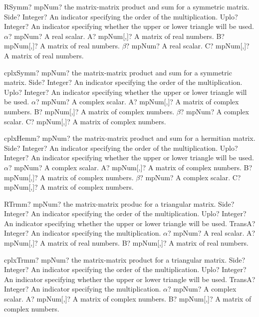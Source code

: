 \documentclass[12pt,a4paper,openany]{book}
\begin{document}
\begin{mpFunctionsExtract}
\mpFunctionSeven
{RSymm? mpNum? the matrix-matrix product and sum for a symmetric matrix.}
{Side? Integer? An indicator specifying the order of the multiplication.}
{Uplo? Integer? An indicator specifying whether the upper or lower triangle will be used.}
{$\alpha$? mpNum? A real scalar.}
{A? mpNum[,]? A matrix of real numbers.}
{B? mpNum[,]? A matrix of real numbers.}
{$\beta$? mpNum? A real scalar.}
{C? mpNum[,]? A matrix of real numbers.}
\end{mpFunctionsExtract}

\begin{mpFunctionsExtract}
\mpFunctionSeven
{cplxSymm? mpNum? the matrix-matrix product and sum for a symmetric matrix.}
{Side? Integer? An indicator specifying the order of the multiplication.}
{Uplo? Integer? An indicator specifying whether the upper or lower triangle will be used.}
{$\alpha$? mpNum? A complex scalar.}
{A? mpNum[,]? A matrix of complex numbers.}
{B? mpNum[,]? A matrix of complex numbers.}
{$\beta$? mpNum? A complex scalar.}
{C? mpNum[,]? A matrix of complex numbers.}
\end{mpFunctionsExtract}

\begin{mpFunctionsExtract}
\mpFunctionSeven
{cplxHemm? mpNum? the matrix-matrix product and sum for a hermitian matrix.}
{Side? Integer? An indicator specifying the order of the multiplication.}
{Uplo? Integer? An indicator specifying whether the upper or lower triangle will be used.}
{$\alpha$? mpNum? A complex scalar.}
{A? mpNum[,]? A matrix of complex numbers.}
{B? mpNum[,]? A matrix of complex numbers.}
{$\beta$? mpNum? A complex scalar.}
{C? mpNum[,]? A matrix of complex numbers.}
\end{mpFunctionsExtract}

\begin{mpFunctionsExtract}
\mpFunctionSix
{RTrmm? mpNum? the matrix-matrix produc for a triangular matrix.}
{Side? Integer? An indicator specifying the order of the multiplication.}
{Uplo? Integer? An indicator specifying whether the upper or lower triangle will be used.}
{TransA? Integer? An indicator specifying the multiplication.}
{$\alpha$? mpNum? A real scalar.}
{A? mpNum[,]? A matrix of real numbers.}
{B? mpNum[,]? A matrix of real numbers.}
\end{mpFunctionsExtract}

\begin{mpFunctionsExtract}
\mpFunctionSix
{cplxTrmm? mpNum? the matrix-matrix product for a triangular matrix.}
{Side? Integer? An indicator specifying the order of the multiplication.}
{Uplo? Integer? An indicator specifying whether the upper or lower triangle will be used.}
{TransA? Integer? An indicator specifying the multiplication.}
{$\alpha$? mpNum? A complex scalar.}
{A? mpNum[,]? A matrix of complex numbers.}
{B? mpNum[,]? A matrix of complex numbers.}
\end{mpFunctionsExtract}
\end{document}
